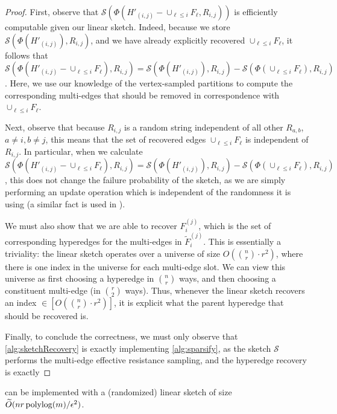 \documentclass{article}
\begin{document}
\begin{proof}
First, observe that $\mathcal{S}(\Phi(H'_{(i,j)} - \cup_{\ell \leq i} F_{\ell}, R_{i,j}))$ is efficiently computable given our linear sketch. Indeed, because we store $\mathcal{S}(\Phi(H'_{(i,j)}), R_{i,j})$, and we have already explicitly recovered $\cup_{\ell \leq i} F_{\ell}$, it follows that $\mathcal{S}(\Phi(H'_{(i,j)} - \cup_{\ell \leq i} F_{\ell}), R_{i,j}) =\mathcal{S}(\Phi(H'_{(i,j)}), R_{i,j}) - \mathcal{S}(\Phi(\cup_{\ell \leq i} F_{\ell}), R_{i,j}) $. Here, we use our knowledge of the vertex-sampled partitions to compute the corresponding multi-edges that should be removed in correspondence with $\cup_{\ell \leq i} F_{\ell}$.

Next, observe that because $R_{i,j}$ is a random string independent of all other $R_{a, b}$, $a \neq i, b \neq j$, this means that the set of recovered edges $\cup_{\ell \leq i} F_{\ell}$ is independent of $R_{i,j}$. In particular, when we calculate $\mathcal{S}(\Phi(H'_{(i,j)} - \cup_{\ell \leq i} F_{\ell}), R_{i,j}) =\mathcal{S}(\Phi(H'_{(i,j)}), R_{i,j}) - \mathcal{S}(\Phi(\cup_{\ell \leq i} F_{\ell}), R_{i,j})$, this does not change the failure probability of the sketch, as we are simply performing an update operation which is independent of the randomness it is using (a similar fact is used in \cite{AGM12}). 

We must also show that we are able to recover $F_i^{(j)}$, which is the set of corresponding hyperedges for the multi-edges in $\widetilde{F}_i^{(j)}$. This is essentially a triviality: the linear sketch operates over a universe of size $O(\binom{n}{r} \cdot r^2)$, where there is one index in the universe for each multi-edge slot. We can view this universe as first choosing a hyperedge in $\binom{n}{r}$ ways, and then choosing a constituent multi-edge (in $\binom{r}{2}$ ways). Thus, whenever the linear sketch recovers an index $\in [O(\binom{n}{r} \cdot r^2)]$, it is explicit what the parent hyperedge that should be recovered is.

Finally, to conclude the correctness, we must only observe that \cref{alg:sketchRecovery} is exactly implementing \cref{alg:sparsify}, as the sketch $\mathcal{S}$ performs the multi-edge effective resistance sampling, and the hyperedge recovery is exactly  
\end{proof}

\begin{claim}\label{clm:linearSketchSpace}
     can be implemented with a (randomized) linear sketch of size $\widetilde{O}(n r \operatorname{polylog}(m) / \epsilon^2)$.
\end{claim}
\end{document}
